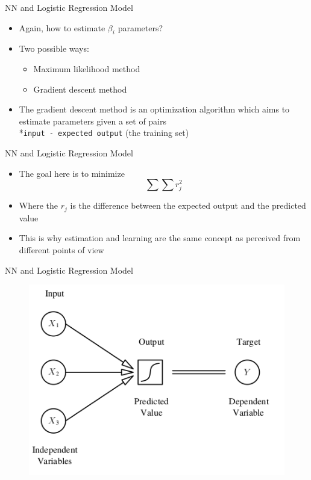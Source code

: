 \documentclass[xcolor ={table,usenames,dvipsnames}]{beamer}
\theoremstyle{definition}
\begin{document}
\begin{frame}{NN and Logistic Regression Model}
\begin{itemize}
	\item Again, how to estimate $\beta_i$ parameters?
	\item Two possible ways:
	\begin{itemize}
	\item \color{red} Maximum likelihood \color{black} method
	\item \color{red} Gradient descent \color{black} method
	\end{itemize}
	\item The gradient descent method is an optimization algorithm which aims to estimate parameters given a set of pairs\\*\texttt{input - expected output} (the training set)
\end{itemize}
\end{frame}
\begin{frame}{NN and Logistic Regression Model}
\begin{itemize}
	\item The goal here is to minimize 	$$
	\sum \sum r_j^2
	$$
	\item	Where the $r_j$ is the difference between the expected output and the predicted value
	\item This is why estimation and learning are the same concept as perceived from different points of view
\end{itemize}
\end{frame}
\begin{frame}{NN and Logistic Regression Model}
	\begin{figure}[h!]
	\centering
	\includegraphics[scale=2.4]{../Relazione/img/logreg}
\end{figure}
\end{frame}
\end{document}
